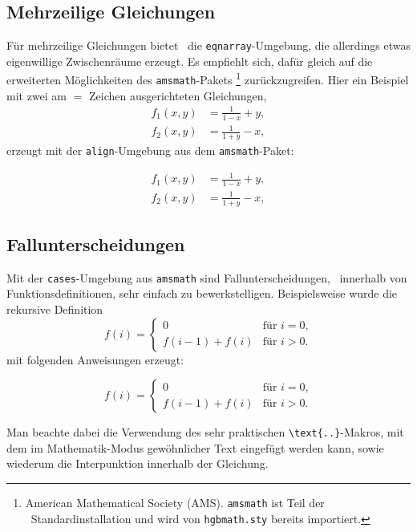 \subsection{Mehrzeilige Gleichungen}

Für mehrzeilige Gleichungen bietet \latex\ die \verb!eqnarray!-Umgebung, die
allerdings etwas eigenwillige Zwischenräume erzeugt. Es empfiehlt sich, dafür
gleich auf die erweiterten Möglichkeiten des \texttt{amsmath}-Pakets%
\footnote{American Mathematical Society (AMS). \texttt{amsmath} ist Teil der
\latex\ Standardinstallation und wird von \texttt{hgbmath.sty} bereits importiert.}
\cite{Mittelbach2025} zurückzugreifen. Hier ein Beispiel mit zwei am $=$
Zeichen ausgerichteten Gleichungen,
%
\begin{align}
	f_1 (x,y) &= \frac{1}{1-x} + y , \label{eq:f1} \\
	f_2 (x,y) &= \frac{1}{1+y} - x , \label{eq:f2}
\end{align}
%
erzeugt mit der \texttt{align}-Umgebung aus dem \texttt{amsmath}-Paket:
%
\begin{LaTeXCode}[numbers=none]
\begin{align}
  f_1 (x,y) &= \frac{1}{1-x} + y , \label{eq:f1} \\
  f_2 (x,y) &= \frac{1}{1+y} - x , \label{eq:f2}
\end{align}
\end{LaTeXCode}


\subsection{Fallunterscheidungen}

Mit der \texttt{cases}-Umgebung aus \texttt{amsmath} sind Fallunterscheidungen,
\ua\ innerhalb von Funktionsdefinitionen, sehr einfach zu bewerkstelligen.
Beispielsweise wurde die rekursive Definition
%
\begin{equation}
	f(i) =
	\begin{cases}
		0             & \text{für $i = 0$,}\\
		f(i-1) + f(i) & \text{für $i > 0$.}
	\end{cases}
\end{equation}%
%
mit folgenden Anweisungen erzeugt:
%
\begin{LaTeXCode}[numbers=none]
\begin{equation}
	f(i) =
	\begin{cases}
	  0             & \text{für $i = 0$,}\\
	  f(i-1) + f(i) & \text{für $i > 0$.}
	\end{cases}
\end{equation}
\end{LaTeXCode}
%
Man beachte dabei die Verwendung des sehr praktischen \verb!\text{..}!-Makros,
mit dem im Mathematik-Modus gewöhnlicher Text eingefügt werden kann, sowie
wiederum die Interpunktion innerhalb der Gleichung.



